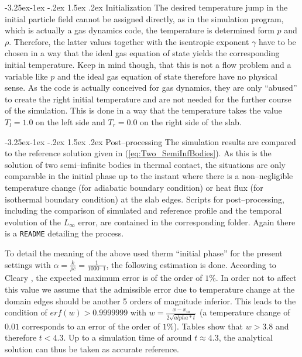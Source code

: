 \documentclass[11pt,a4paper,twoside]{report}
\makeatletter
\renewcommand\paragraph{\@startsection{paragraph}{4}{\z@}%
  {-3.25ex\@plus -1ex \@minus -.2ex}%
  {1.5ex \@plus .2ex}%
  {\normalfont\normalsize\bfseries}}
\makeatother
\begin{document}
\paragraph{Initialization}
The desired temperature jump in the initial particle field cannot be assigned directly, as in the simulation program, which is actually a gas dynamics code, the temperature is determined form $p$ and $\rho$. Therefore, the latter values together with the isentropic exponent $\gamma$ have to be chosen in a way that the ideal gas equation of state yields the corresponding initial temperature. Keep in mind though, that this is not a flow problem and a variable like $p$ and the ideal gas equation of state therefore have no physical sense. As the code is actually conceived for gas dynamics, they are only ``abused'' to create the right initial temperature  and are not needed for the further course of the simulation.
This is done in a way that the temperature takes the value $T_l=1.0$ on the left side and $T_r=0.0$ on the right side of the slab.



\paragraph{Post--processing}
The simulation results are compared to the reference solution given in (\ref{eq:Two_SemiInfBodies}). As this is the solution of two semi--infinite bodies in thermal contact, the situations are only comparable in the initial phase up to the instant where there is a non--negligible temperature change (for adiabatic boundary condition) or heat flux (for isothermal boundary condition) at the slab edges.
Scripts for post--processing, including the comparison of simulated and reference profile and the temporal evolution of the $L_\infty$ error, are contained in the corresponding folder. Again there is a {\tt README} detailing the process.

To detail the meaning of the above used therm ``initial phase'' for the present settings with $\alpha=\frac{k}{\rho c}=\frac{1}{1000\cdot 1}$, the following estimation is done. According to Cleary \cite{Cleary1999}, the expected maximum error is of the order of $1\%$. In order not to affect this value we assume that the admissible error due to temperature change at the domain edges should be another 5 orders of magnitude inferior. This leads to the condition of $erf(w)>0.9999999$ 
with $w=\frac{x-x_m}{2\sqrt{alpha*t}}$ (a temperature change of $0.01$ corresponds to an error of the order of $1\%$). Tables show that $w>3.8$ and therefore $t<4.3$. Up to a simulation time of around $t\approx 4.3$, the analytical solution can thus be taken as accurate reference. 
\end{document}
